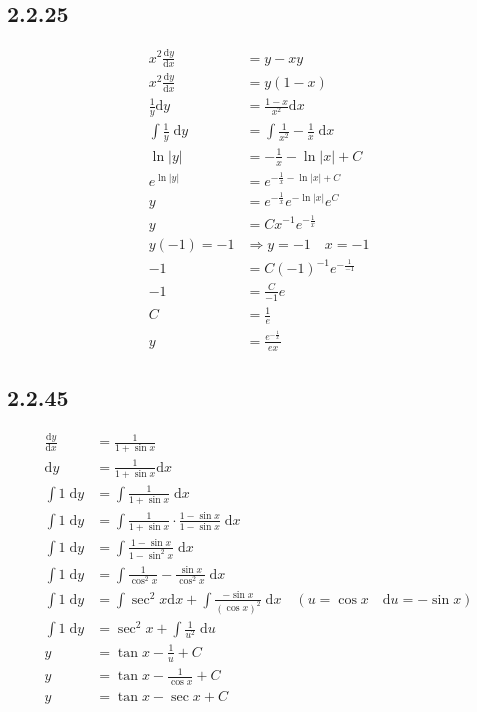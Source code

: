 \documentclass{article}
\begin{document}
\subsection{2.2.25}
\begin{align*}
    x^2 \frac{\mathrm{d}y}{\mathrm{d}x} &= y-xy \\
    x^2 \frac{\mathrm{d}y}{\mathrm{d}x} &= y(1-x)\\
    \frac{1}{y}\mathrm{d}y &= \frac{1-x}{x^2}\mathrm{d}x\\
    \int \frac{1}{y} \; \mathrm{d}y &= \int \frac{1}{x^2}-\frac{1}{x} \; \mathrm{d}x\\  
    \ln\left|y\right| &= -\frac{1}{x}-\ln\left|x\right|+C\\
    e^{\ln\left|y\right|} &= e^{-\frac{1}{x}-\ln\left|x\right|+C}\\
    y &= e^{-\frac{1}{x}}e^{-\ln\left|x\right|}e^{C}\\
    y &= Cx^{-1}e^{-\frac{1}{x}}\\
    y(-1) = -1 &\Rightarrow y  = -1 \quad x = -1\\
    -1 &= C(-1)^{-1}e^{-\frac{1}{-1}}\\
    -1 &= \frac{C}{-1}e \\
    C &= \frac{1}{e}\\
    y &= \frac{e^{-\frac{1}{x}}}{ex}
\end{align*}

\subsection{2.2.45}
\begin{align*}
    \frac{\mathrm{d}y}{\mathrm{d}x} &= \frac{1}{1+\sin x} \\
    \mathrm{d}y &= \frac{1}{1+\sin x} \mathrm{d}x\\
    \int 1 \; \mathrm{d}y &= \int \frac{1}{1+\sin x} \; \mathrm{d}x \\
    \int 1 \; \mathrm{d}y &= \int \frac{1}{1+\sin x}\cdot \frac{1-\sin x}{1-\sin x} \; \mathrm{d}x \\
    \int 1 \; \mathrm{d}y &= \int \frac{1-\sin x}{1-\sin ^2x} \; \mathrm{d}x \\
    \int 1 \; \mathrm{d}y &= \int \frac{1}{\cos ^2x}-\frac{\sin x}{\cos ^2x} \; \mathrm{d}x\\
    \int 1 \; \mathrm{d}y &= \int \sec ^2x \mathrm{d}x +\int \frac{-\sin x}{(\cos x)^2} \; \mathrm{d}x \quad (u=\cos x \quad \mathrm{d}u = -\sin x  )\\
    \int 1 \; \mathrm{d}y &= \sec^2x+\int \frac{1}{u^2} \; \mathrm{d}u \\
    y &= \tan x-\frac{1}{u} +C\\
    y &= \tan x-\frac{1}{\cos x}+C\\
    y &= \tan x-\sec x + C
\end{align*}
\end{document}
